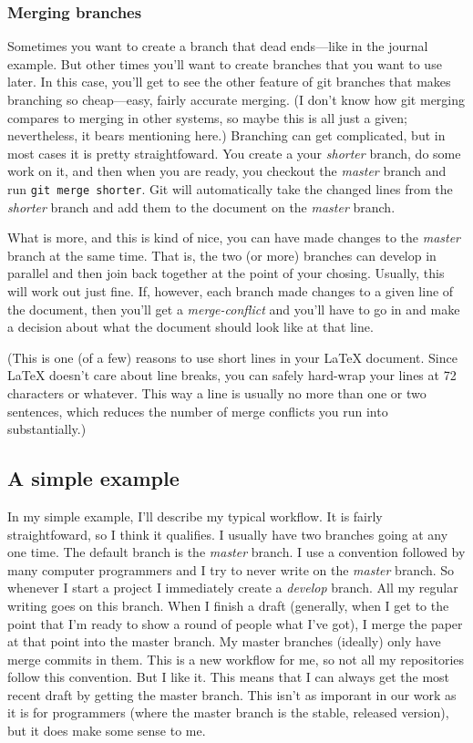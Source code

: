 \documentclass{article}
\begin{document}
\subsubsection{Merging branches}

Sometimes you want to create a branch that dead ends—like in the
journal example. But other times you'll want to create branches
that you want to use later. In this case, you'll get to see the
other feature of git branches that makes branching so cheap—easy,
fairly accurate merging. (I don't know how git merging compares to
merging in other systems, so maybe this is all just a given;
nevertheless, it bears mentioning here.) Branching can get
complicated, but in most cases it is pretty straightfoward. You
create a your \emph{shorter} branch, do some work on it, and then
when you are ready, you checkout the \emph{master} branch and run
\verb!git merge shorter!. Git will automatically take the changed
lines from the \emph{shorter} branch and add them to the document
on the \emph{master} branch.

What is more, and this is kind of nice, you can have made changes
to the \emph{master} branch at the same time. That is, the two (or
more) branches can develop in parallel and then join back together
at the point of your chosing. Usually, this will work out just
fine. If, however, each branch made changes to a given line of the
document, then you'll get a \emph{merge-conflict} and you'll have
to go in and make a decision about what the document should look
like at that line.

(This is one (of a few) reasons to use short lines in your LaTeX
document. Since LaTeX doesn't care about line breaks, you can
safely hard-wrap your lines at 72 characters or whatever. This way
a line is usually no more than one or two sentences, which reduces
the number of merge conflicts you run into substantially.)

\subsection{A simple example}

In my simple example, I'll describe my typical workflow. It is
fairly straightfoward, so I think it qualifies. I usually have two
branches going at any one time. The default branch is the
\emph{master} branch. I use a convention followed by many computer
programmers and I try to never write on the \emph{master} branch.
So whenever I start a project I immediately create a \emph{develop}
branch. All my regular writing goes on this branch. When I finish a
draft (generally, when I get to the point that I'm ready to show a
round of people what I've got), I merge the paper at that point
into the master branch. My master branches (ideally) only have
merge commits in them. This is a new workflow for me, so not all my
repositories follow this convention. But I like it. This means that
I can always get the most recent draft by getting the master
branch. This isn't as imporant in our work as it is for programmers
(where the master branch is the stable, released version), but it
does make some sense to me.
\end{document}
